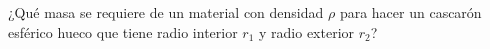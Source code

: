 \item ¿Qué masa se requiere de un material con densidad $\rho$ para hacer un cascarón esférico hueco que tiene radio interior $r_1$ y radio exterior $r_2$?
